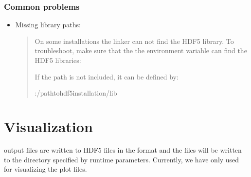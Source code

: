 \documentclass[letterpaper,10pt,english]{sphinxmanual}
\begin{document}
\subsubsection{Common problems}
\label{\detokenize{Base/GettingStarted:common-problems}}\begin{itemize}
\item {} 
Missing library paths:
\begin{quote}

On some installations the linker can not find the HDF5 library.
To troubleshoot, make sure that the the environment variable  can find the HDF5 libraries:

\begin{sphinxVerbatim}[commandchars=\\\{\},formatcom=\scriptsize]
 
\end{sphinxVerbatim}

If the path is not included, it can be defined by:

\begin{sphinxVerbatim}[commandchars=\\\{\},formatcom=\scriptsize]
 :/\PYGZlt{}path\PYGZus{}to\PYGZus{}hdf5\PYGZus{}installation\PYGZgt{}/lib
\end{sphinxVerbatim}
\end{quote}

\end{itemize}


\section{Visualization}
\label{\detokenize{Base/Visualization:visualization}}\label{\detokenize{Base/Visualization:chap-visualization}}\label{\detokenize{Base/Visualization::doc}}
 output files are written to HDF5 files in the format  and the files will be written to the directory specified by {\hyperref[\detokenize{Source/Driver:chap-driver}]{}} runtime parameters.
Currently, we have only used  for visualizing the plot files.
\end{document}
